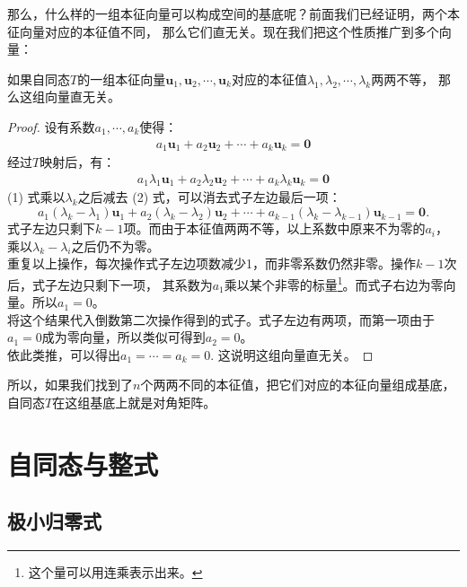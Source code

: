 \documentclass[12pt,UTF8]{ctexbook}
\begin{document}
那么，什么样的一组本征向量可以构成空间的基底呢？前面我们已经证明，两个本征向量对应的本征值不同，
那么它们直无关。现在我们把这个性质推广到多个向量：
\begin{pp}\label{pp:6_2}
    如果自同态$T$的一组本征向量$\mathbf{u}_1, \mathbf{u}_2, \cdots, \mathbf{u}_k$对应的本征值$\lambda_1, \lambda_2, \cdots, \lambda_k$两两不等，
    那么这组向量直无关。
\end{pp}
\begin{proof} %
    设有系数$a_1, \cdots, a_k$使得：
    \begin{align*}
         a_1 \mathbf{u}_1 + a_2 \mathbf{u}_2 + \cdots + a_k \mathbf{u}_k = \mathbf{0}\tag{1}
    \end{align*}
    经过$T$映射后，有：
    \begin{align*} 
        a_1 \lambda_1\mathbf{u}_1 + a_2 \lambda_2 \mathbf{u}_2 + \cdots + a_k \lambda_k \mathbf{u}_k = \mathbf{0}\tag{2}
    \end{align*}
    (1) 式乘以$\lambda_k$之后减去 (2) 式，可以消去式子左边最后一项：
    $$ a_1 (\lambda_k - \lambda_1)\mathbf{u}_1 + a_2 (\lambda_k - \lambda_2) \mathbf{u}_2 + \cdots + a_{k-1} (\lambda_k - \lambda_{k-1}) \mathbf{u}_{k-1} = \mathbf{0}.$$
    式子左边只剩下$k-1$项。而由于本征值两两不等，以上系数中原来不为零的$a_i$，乘以$\lambda_k - \lambda_i$之后仍不为零。\\
    重复以上操作，每次操作式子左边项数减少1，而非零系数仍然非零。操作$k-1$次后，式子左边只剩下一项，
    其系数为$a_1$乘以某个非零的标量\footnote{这个量可以用连乘表示出来。}。而式子右边为零向量。所以$a_1 = 0$。\\
    将这个结果代入倒数第二次操作得到的式子。式子左边有两项，而第一项由于$a_1=0$成为零向量，所以类似可得到$a_2 = 0$。\\
    依此类推，可以得出$a_1 = \cdots = a_k = 0.$ 这说明这组向量直无关。 
    
\end{proof}

所以，如果我们找到了$n$个两两不同的本征值，把它们对应的本征向量组成基底，自同态$T$在这组基底上就是对角矩阵。

\section{自同态与整式}

\subsection{极小归零式}
\end{document}
